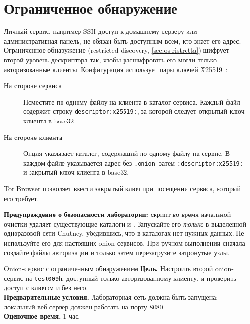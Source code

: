 \section{Ограниченное обнаружение}\label{sec:onionp-ristretta}

Личный сервис, например SSH-доступ к домашнему серверу или административная панель, не обязан быть доступным всем, кто знает его адрес. Ограниченное обнаружение (restricted discovery, \cref{sec:os-ristretta}) шифрует второй уровень дескриптора так, чтобы расшифровать его могли только авторизованные клиенты. Конфигурация использует пары ключей X25519~\cite{torspec}:
\begin{description}
  \item[На стороне сервиса] Поместите по одному файлу  на клиента в каталог  сервиса. Каждый файл содержит строку \texttt{descriptor:\allowbreak x25519:}, за которой следует открытый ключ клиента в base32.
  \item[На стороне клиента] Опция  указывает каталог, содержащий по одному файлу  на сервис. В каждом файле указывается адрес без \texttt{.onion}, затем \texttt{:\allowbreak descriptor:\allowbreak x25519:} и закрытый ключ клиента в base32.
\end{description}
Tor Browser позволяет ввести закрытый ключ при посещении сервиса, который его требует.

\textbf{Предупреждение о безопасности лаборатории:} скрипт  во время начальной очистки удаляет существующие каталоги  и . Запускайте его \emph{только} в выделенной одноразовой сети Chutney, убедившись, что в каталогах нет нужных данных. Не используйте его для настоящих onion-сервисов. При ручном выполнении сначала создайте файлы авторизации и только затем перезагрузите затронутые узлы.

\begin{laboratorio}[13]{Onion-сервис с ограниченным обнаружением}
\textbf{Цель.} Настроить второй onion-сервис на \texttt{test009h}, доступный только авторизованному клиенту, и проверить доступ с ключом и без него.\\
\textbf{Предварительные условия.} Лабораторная сеть должна быть запущена; локальный веб-сервер должен работать на порту 8080.\\
\textbf{Оценочное время.} 1 час.
\end{laboratorio}

